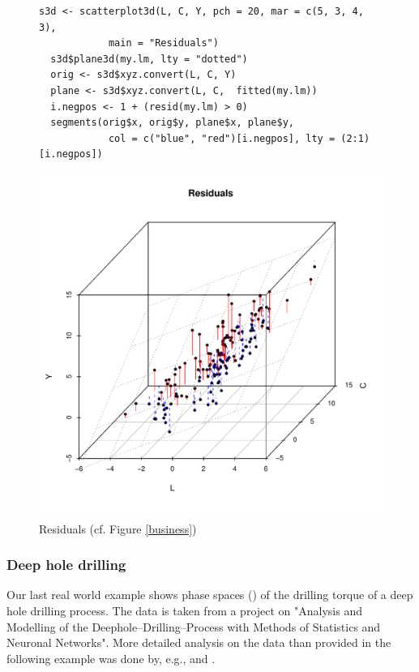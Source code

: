 \begin{figure}[htb!]
\small
\begin{Verbatim}[frame=single]
  s3d <- scatterplot3d(L, C, Y, pch = 20, mar = c(5, 3, 4, 3),
            main = "Residuals")
  s3d$plane3d(my.lm, lty = "dotted")
  orig <- s3d$xyz.convert(L, C, Y)
  plane <- s3d$xyz.convert(L, C,  fitted(my.lm))
  i.negpos <- 1 + (resid(my.lm) > 0)
  segments(orig$x, orig$y, plane$x, plane$y,
            col = c("blue", "red")[i.negpos], lty = (2:1)[i.negpos])
\end{Verbatim}
\normalsize
\begin{center}\includegraphics[width=13cm]{residuals}\end{center}
\vspace*{-5mm}\caption{Residuals (cf. Figure \ref{business})\label{residuals}}
\end{figure}


\clearpage
\subsubsection{Deep hole drilling}
Our last real world example shows phase spaces (\cite{tong93}) of the drilling torque of a deep hole drilling process.
The data is taken from a project on
"Analysis and Modelling of the Deephole--Drilling--Process with Methods of Statistics and Neuronal Networks".
More detailed analysis on the data than provided in the following example was done by,
e.g.,  and .

